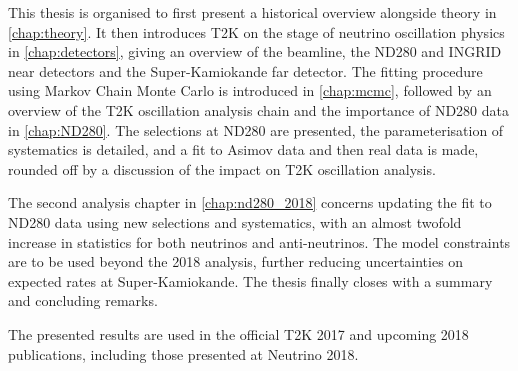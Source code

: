 This thesis is organised to first present a historical overview alongside theory in \autoref{chap:theory}. It then introduces T2K on the stage of neutrino oscillation physics in \autoref{chap:detectors}, giving an overview of the beamline, the ND280 and INGRID near detectors and the Super-Kamiokande far detector. The fitting procedure using Markov Chain Monte Carlo is introduced in \autoref{chap:mcmc}, followed by an overview of the T2K oscillation analysis chain and the importance of ND280 data in \autoref{chap:ND280}. The selections at ND280 are presented, the parameterisation of systematics is detailed, and a fit to Asimov data and then real data is made, rounded off by a discussion of the impact on T2K oscillation analysis.

The second analysis chapter in \autoref{chap:nd280_2018} concerns updating the fit to ND280 data using new selections and systematics, with an almost twofold increase in statistics for both neutrinos and anti-neutrinos. The model constraints are to be used beyond the 2018 analysis, further reducing uncertainties on expected rates at Super-Kamiokande. The thesis finally closes with a summary and concluding remarks.

The presented results are used in the official T2K 2017\cite{t2k_2017} and upcoming 2018 publications, including those presented at Neutrino 2018\cite{t2k_neutrino2018}.
